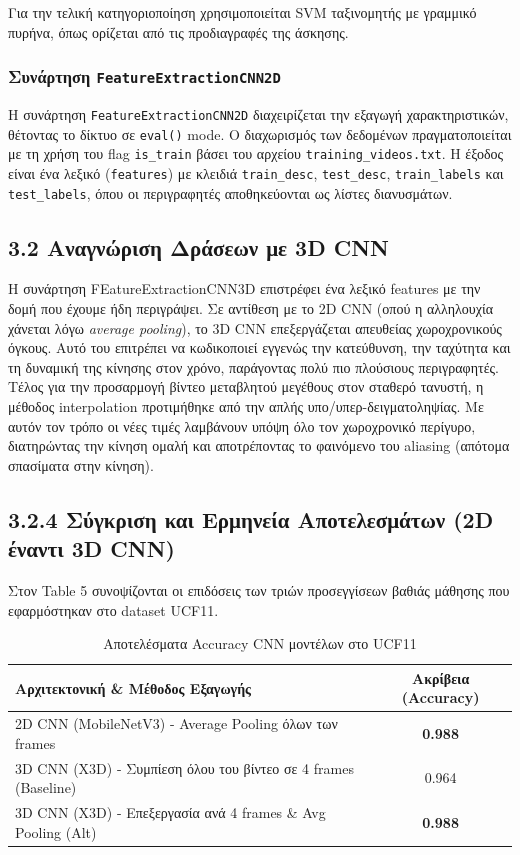 \documentclass[12pt]{article}
\begin{document}
Για την τελική κατηγοριοποίηση χρησιμοποιείται SVM ταξινομητής με γραμμικό πυρήνα, όπως ορίζεται από τις προδιαγραφές της άσκησης.

\subsubsection*{Συνάρτηση \texttt{FeatureExtractionCNN2D}}
Η συνάρτηση \texttt{FeatureExtractionCNN2D} διαχειρίζεται την εξαγωγή χαρακτηριστικών, θέτοντας το δίκτυο σε \texttt{eval()} mode. Ο διαχωρισμός των δεδομένων πραγματοποιείται με τη χρήση του flag \texttt{is\_train} βάσει του αρχείου \texttt{training\_videos.txt}. Η έξοδος είναι ένα λεξικό (\texttt{features}) με κλειδιά \texttt{train\_desc}, \texttt{test\_desc}, \texttt{train\_labels} και \texttt{test\_labels}, όπου οι περιγραφητές αποθηκεύονται ως λίστες διανυσμάτων.


\subsection*{3.2 Αναγνώριση Δράσεων με 3D CNN}

Η συνάρτηση FEatureExtractionCNN3D επιστρέφει ένα λεξικό features με την δομή που έχουμε ήδη περιγράψει. Σε αντίθεση με το 2D CNN (οπού η αλληλουχία χάνεται λόγω \textit{average pooling}), το 3D CNN επεξεργάζεται απευθείας χωροχρονικούς όγκους. Αυτό του επιτρέπει να κωδικοποιεί εγγενώς την κατεύθυνση, την ταχύτητα και τη δυναμική της κίνησης στον χρόνο, παράγοντας πολύ πιο πλούσιους περιγραφητές.
Τέλος για την προσαρμογή βίντεο μεταβλητού μεγέθους στον σταθερό τανυστή, η μέθοδος interpolation προτιμήθηκε από την απλής υπο/υπερ-δειγματοληψίας. Με αυτόν τον τρόπο οι νέες τιμές λαμβάνουν υπόψη όλο τον χωροχρονικό περίγυρο, διατηρώντας την κίνηση ομαλή και αποτρέποντας το φαινόμενο του aliasing (απότομα σπασίματα στην κίνηση).


\subsection*{3.2.4 Σύγκριση και Ερμηνεία Αποτελεσμάτων (2D έναντι 3D CNN)}

Στον Table 5 συνοψίζονται οι επιδόσεις των τριών προσεγγίσεων βαθιάς μάθησης που εφαρμόστηκαν στο dataset UCF11.

\begin{table}[h!]
\centering
\begin{tabular}{@{}lc@{}}
\toprule
\textbf{Αρχιτεκτονική \& Μέθοδος Εξαγωγής} & \textbf{Ακρίβεια (Accuracy)} \\ \midrule
2D CNN (MobileNetV3) - Average Pooling όλων των frames        & \textbf{0.988} \\
3D CNN (X3D) - Συμπίεση όλου του βίντεο σε 4 frames (Baseline)& 0.964          \\
3D CNN (X3D) - Επεξεργασία ανά 4 frames \& Avg Pooling (Alt)  & \textbf{0.988} \\ \bottomrule
\end{tabular}
\caption{Αποτελέσματα Accuracy CNN μοντέλων στο UCF11}
\label{tab:cnn_results}
\end{table}
\end{document}
